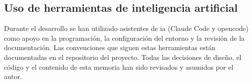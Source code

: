 
\subsection{Uso de herramientas de inteligencia artificial}
\label{sec:uso_ia}

Durante el desarrollo se han utilizado asistentes de \gls{ia} (Claude Code y opencode) como apoyo en la programación, la configuración del entorno y la revisión de la documentación. Las convenciones que siguen estas herramientas están documentadas en el repositorio del proyecto. Todas las decisiones de diseño, el código y el contenido de esta memoria han sido revisados y asumidos por el autor.
